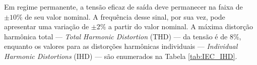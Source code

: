 \documentclass[repeatfields,oneside,overleaf]{tcc}
\begin{document}

Em regime permanente, a tensão eficaz de saída deve permanecer na faixa de $\pm 10 \%$ de seu valor nominal.
A frequência desse sinal, por sua vez, pode apresentar uma variação de $\pm 2 \%$ a partir do valor nominal.
A máxima distorção harmônica total --- \textit{Total Harmonic Distortion} (THD) --- da tensão é de $8 \%$, enquanto os valores para as distorções harmônicas individuais --- \textit{Individual Harmonic Distortions} (IHD) --- são enumerados na Tabela \ref{tab:IEC_IHD}.
\end{document}
